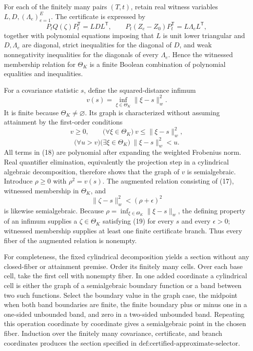 For each of the finitely many pairs \((T,t)\), retain real witness variables \(L,D,(\Lambda_e)_{e=1}^E\).  The certificate is expressed by
\[
 P_tQ(\zeta)P_t^{\mathsf T}=LDL^{\mathsf T},
 \qquad
 P_t(Z_e-Z_0)P_t^{\mathsf T}=L\Lambda_eL^{\mathsf T}, \tag{17}
\]
together with polynomial equations imposing that \(L\) is unit lower triangular and \(D,\Lambda_e\) are diagonal, strict inequalities for the diagonal of \(D\), and weak nonnegativity inequalities for the diagonals of every \(\Lambda_e\).  Hence the witnessed membership relation for \(\Theta_K\) is a finite Boolean combination of polynomial equalities and inequalities.

For a covariance statistic \(s\), define the squared-distance infimum
\[
 v(s)=\inf_{\xi\in\Theta_K}\lVert\xi-s\rVert_w^2.
\]
It is finite because \(\Theta_K\ne\varnothing\).  Its graph is characterized without assuming attainment by the first-order conditions
\[
 v\ge0,\qquad
 \bigl(\forall\xi\in\Theta_K\bigr)\ v\le\lVert\xi-s\rVert_w^2,
\]
\[
 \bigl(\forall u>v\bigr)\bigl(\exists\xi\in\Theta_K\bigr)
 \ \lVert\xi-s\rVert_w^2<u. \tag{18}
\]
All terms in (18) are polynomial after expanding the weighted Frobenius norm.  Real quantifier elimination, equivalently the projection step in a cylindrical algebraic decomposition, therefore shows that the graph of \(v\) is semialgebraic.  Introduce \(\rho\ge0\) with \(\rho^2=v(s)\).  The augmented relation consisting of (17), witnessed membership in \(\Theta_K\), and
\[
 \lVert\zeta-s\rVert_w^2<(\rho+\epsilon)^2 \tag{19}
\]
is likewise semialgebraic.  Because \(\rho=\inf_{\xi\in\Theta_K}\lVert\xi-s\rVert_w\), the defining property of an infimum supplies a \(\zeta\in\Theta_K\) satisfying (19) for every \(s\) and every \(\epsilon>0\); witnessed membership supplies at least one finite certificate branch.  Thus every fiber of the augmented relation is nonempty.

For completeness, the fixed cylindrical decomposition yields a section without any closed-fiber or attainment premise.  Order its finitely many cells.  Over each base cell, take the first cell with nonempty fiber.  In one added coordinate a cylindrical cell is either the graph of a semialgebraic boundary function or a band between two such functions.  Select the boundary value in the graph case, the midpoint when both band boundaries are finite, the finite boundary plus or minus one in a one-sided unbounded band, and zero in a two-sided unbounded band.  Repeating this operation coordinate by coordinate gives a semialgebraic point in the chosen fiber.  Induction over the finitely many covariance, certificate, and branch coordinates produces the section specified in \(\text{def:certified-approximate-selector}\).

